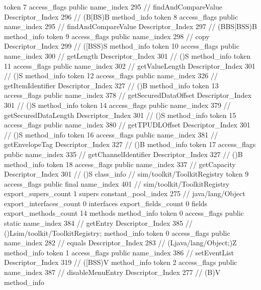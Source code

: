 {{{{{					token	7
					access_flags	public
					name_index	295		// findAndCompareValue
					Descriptor_Index	296		// (B[BS)B
				}
				method_info {
					token	8
					access_flags	public
					name_index	295		// findAndCompareValue
					Descriptor_Index	297		// (BBS[BSS)B
				}
				method_info {
					token	9
					access_flags	public
					name_index	298		// copy
					Descriptor_Index	299		// ([BSS)S
				}
				method_info {
					token	10
					access_flags	public
					name_index	300		// getLength
					Descriptor_Index	301		// ()S
				}
				method_info {
					token	11
					access_flags	public
					name_index	302		// getValueLength
					Descriptor_Index	301		// ()S
				}
				method_info {
					token	12
					access_flags	public
					name_index	326		// getItemIdentifier
					Descriptor_Index	327		// ()B
				}
				method_info {
					token	13
					access_flags	public
					name_index	378		// getSecuredDataOffset
					Descriptor_Index	301		// ()S
				}
				method_info {
					token	14
					access_flags	public
					name_index	379		// getSecuredDataLength
					Descriptor_Index	301		// ()S
				}
				method_info {
					token	15
					access_flags	public
					name_index	380		// getTPUDLOffset
					Descriptor_Index	301		// ()S
				}
				method_info {
					token	16
					access_flags	public
					name_index	381		// getEnvelopeTag
					Descriptor_Index	327		// ()B
				}
				method_info {
					token	17
					access_flags	public
					name_index	335		// getChannelIdentifier
					Descriptor_Index	327		// ()B
				}
				method_info {
					token	18
					access_flags	public
					name_index	337		// getCapacity
					Descriptor_Index	301		// ()S
				}
			}
		}
		class_info {		// sim/toolkit/ToolkitRegistry
			token	9
			access_flags	public final
			name_index	401		// sim/toolkit/ToolkitRegistry
			export_supers_count	1
			supers {
				constant_pool_index	275		// java/lang/Object
			}
			export_interfaces_count	0
			interfaces {
			}
			export_fields_count	0
			fields {
			}
			export_methods_count	14
			methods {
				method_info {
					token	0
					access_flags	public static
					name_index	384		// getEntry
					Descriptor_Index	385		// ()Lsim/toolkit/ToolkitRegistry;
				}
				method_info {
					token	0
					access_flags	public
					name_index	282		// equals
					Descriptor_Index	283		// (Ljava/lang/Object;)Z
				}
				method_info {
					token	1
					access_flags	public
					name_index	386		// setEventList
					Descriptor_Index	319		// ([BSS)V
				}
				method_info {
					token	2
					access_flags	public
					name_index	387		// disableMenuEntry
					Descriptor_Index	277		// (B)V
				}
				method_info {
}}}}}
